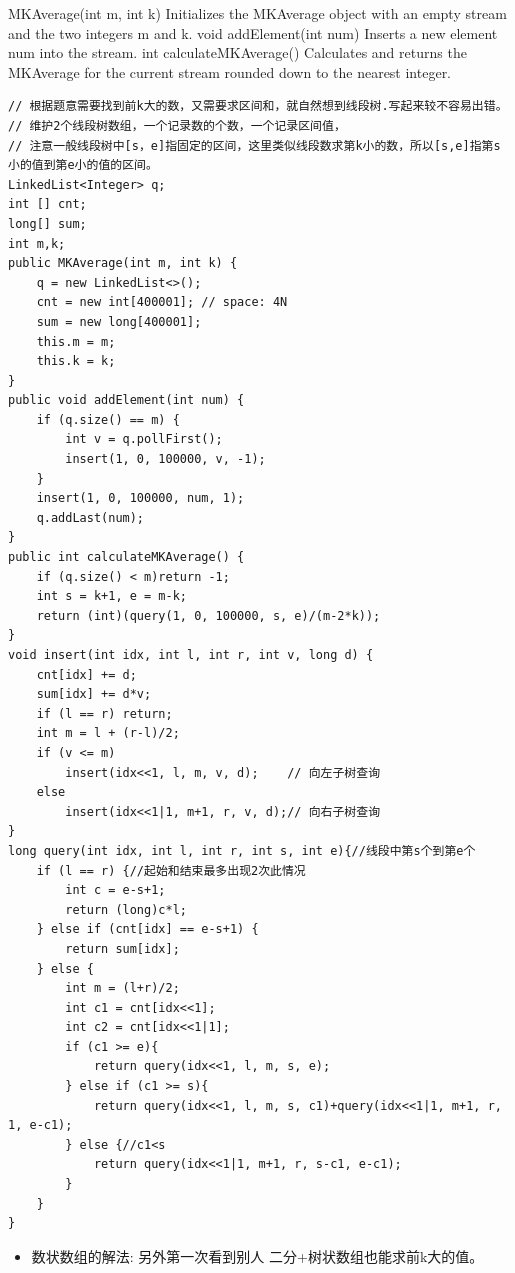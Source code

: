 \documentclass[9pt, b5paaper]{book}
\begin{document}
MKAverage(int m, int k) Initializes the MKAverage object with an empty stream and the two integers m and k.
void addElement(int num) Inserts a new element num into the stream.
int calculateMKAverage() Calculates and returns the MKAverage for the current stream rounded down to the nearest integer.
\begin{verbatim}
// 根据题意需要找到前k大的数，又需要求区间和，就自然想到线段树.写起来较不容易出错。
// 维护2个线段树数组，一个记录数的个数，一个记录区间值，
// 注意一般线段树中[s，e]指固定的区间，这里类似线段数求第k小的数，所以[s,e]指第s小的值到第e小的值的区间。
LinkedList<Integer> q;
int [] cnt;
long[] sum;
int m,k;
public MKAverage(int m, int k) {
    q = new LinkedList<>();
    cnt = new int[400001]; // space: 4N
    sum = new long[400001];
    this.m = m;
    this.k = k;
}
public void addElement(int num) {
    if (q.size() == m) {
        int v = q.pollFirst();
        insert(1, 0, 100000, v, -1);
    }
    insert(1, 0, 100000, num, 1);
    q.addLast(num);
}
public int calculateMKAverage() {
    if (q.size() < m)return -1;
    int s = k+1, e = m-k;
    return (int)(query(1, 0, 100000, s, e)/(m-2*k));
}
void insert(int idx, int l, int r, int v, long d) {
    cnt[idx] += d;
    sum[idx] += d*v;
    if (l == r) return;
    int m = l + (r-l)/2;
    if (v <= m)
        insert(idx<<1, l, m, v, d);    // 向左子树查询
    else
        insert(idx<<1|1, m+1, r, v, d);// 向右子树查询
}
long query(int idx, int l, int r, int s, int e){//线段中第s个到第e个
    if (l == r) {//起始和结束最多出现2次此情况
        int c = e-s+1;
        return (long)c*l;
    } else if (cnt[idx] == e-s+1) {
        return sum[idx];
    } else {
        int m = (l+r)/2;
        int c1 = cnt[idx<<1];
        int c2 = cnt[idx<<1|1];
        if (c1 >= e){
            return query(idx<<1, l, m, s, e);
        } else if (c1 >= s){
            return query(idx<<1, l, m, s, c1)+query(idx<<1|1, m+1, r, 1, e-c1);
        } else {//c1<s
            return query(idx<<1|1, m+1, r, s-c1, e-c1);
        }
    }
}
\end{verbatim}
\begin{itemize}
\item 数状数组的解法: 另外第一次看到别人 二分+树状数组也能求前k大的值。
\end{itemize}
\end{document}
